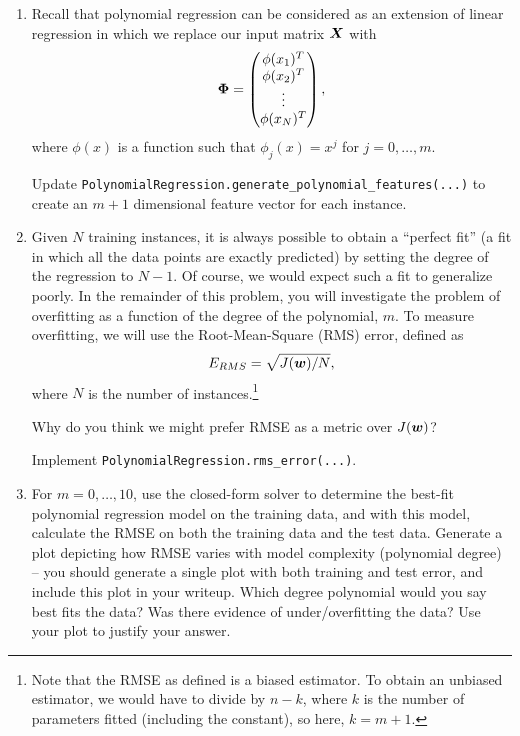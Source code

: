\documentclass[11pt]{article}
\begin{document}
\begin{enumerate}[resume]

\item {} 
Recall that polynomial regression can be considered as an extension of linear regression in which we replace our input matrix $\boldsymbol{X}$ with
\begin{equation*}
\boldsymbol{\Phi} = \begin{pmatrix}
\phi(x_{1})^T  \\
\phi(x_{2})^T  \\
\vdots  \\
\phi(x_{N})^T \\
\end{pmatrix},
\end{equation*}
where $\phi(x)$ is a function such that $\phi_j(x) = x^j$ for $j = 0, \ldots, m$.

Update \verb|PolynomialRegression.generate_polynomial_features(...)| to create an $m+1$ dimensional feature vector for each instance.
\solution{
}

\item {} Given $N$ training instances, it is always possible to obtain a ``perfect fit'' (a fit in which all the data points are exactly predicted) by setting the degree of the regression to $N-1$. Of course, we would expect such a fit to generalize poorly. In the remainder of this problem, you will investigate the problem of overfitting as a function of the degree of the polynomial, $m$. To measure overfitting, we will use the Root-Mean-Square (RMS) error, defined as 
\begin{equation*}
E_{RMS} = \sqrt{J(\boldsymbol{w}) / N},
\end{equation*}
where $N$ is the number of instances.\footnote{Note that the RMSE as defined is a biased estimator. To obtain an unbiased estimator, we would have to divide by $n-k$, where $k$ is the number of parameters fitted (including the constant), so here, $k = m+1$.}

Why do you think we might prefer RMSE as a metric over $J(\boldsymbol{w})$?
\solution{
 }

Implement \verb|PolynomialRegression.rms_error(...)|.
\solution{
 }

\item {} For $m = 0, \ldots, 10$, use the closed-form solver to determine the best-fit polynomial regression model on the training data, and with this model, calculate the RMSE on both the training data and the test data. Generate a plot depicting how RMSE varies with model complexity (polynomial degree) -- you should generate a single plot with both training and test error, and include this plot in your writeup. Which degree polynomial would you say best fits the data? Was there evidence of under/overfitting the data? Use your plot to justify your answer.
\solution{

}

\end{enumerate}
\end{document}
